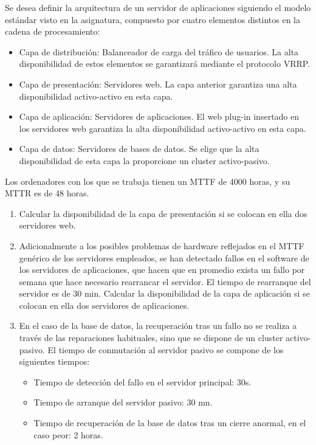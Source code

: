 \begin{problem}[11]
Se desea definir la arquitectura de un servidor de aplicaciones
 siguiendo el modelo estándar visto en la asignatura, compuesto por
cuatro elementos distintos en la cadena de procesamiento:
\begin{itemize}
	\item Capa de distribución: Balanceador de carga del tráfico de usuarios.
La alta disponibilidad de estos elementos se garantizará mediante el
protocolo VRRP.
	\item Capa de presentación: Servidores web. La capa anterior garantiza una alta disponibilidad activo-activo en esta capa.
	\item Capa de aplicación: Servidores de aplicaciones. El web plug-in
insertado en los servidores web garantiza la alta disponibilidad
activo-activo en esta capa.
	\item Capa de datos: Servidores de bases de datos. Se elige que la
alta disponibilidad de esta capa la proporcione un cluster
activo-pasivo.

\end{itemize}

Los ordenadores con los que se trabaja tienen un MTTF de 4000 horas, y su MTTR es de 48 horas.
\begin{enumerate}
	\item Calcular la disponibilidad de la capa de presentación si se colocan en ella dos servidores web.
	\item Adicionalmente a los posibles problemas de hardware reflejados
en el MTTF genérico de los servidores empleados, se han detectado fallos
 en el software de los servidores de aplicaciones, que hacen que en
promedio exista un fallo por semana que hace necesario rearrancar el
servidor. El tiempo de rearranque del servidor es de 30 min. Calcular la
disponibilidad de la capa de aplicación si se colocan en ella dos
servidores de aplicaciones.
	\item En el caso de la base de datos, la recuperación tras un fallo
no se realiza a través de las reparaciones habituales, sino que se
dispone de un cluster activo-pasivo. El tiempo de conmutación al
servidor pasivo se compone de los siguientes tiempos:
\begin{itemize}
	\item Tiempo de detección del fallo en el servidor principal: 30s.
	\item Tiempo de arranque del servidor pasivo: 30 mn.
	\item Tiempo de recuperación de la base de datos tras un cierre anormal, en el caso peor: 2 horas.


\end{itemize}
\end{enumerate}
\end{problem}

